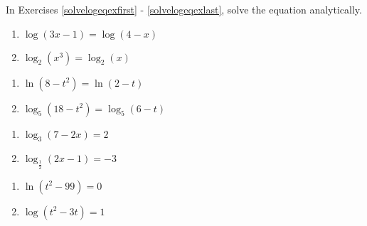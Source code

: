 \documentclass{ximera}
\begin{document}
	\author{Stitz-Zeager}



\label{ExercisesforLogarithmicEquationsandInequalities}

In Exercises \ref{solvelogeqexfirst} - \ref{solvelogeqexlast}, solve the equation analytically.

\begin{multicols}{2}
\begin{enumerate}

\item $\log(3x-1) = \log(4-x)$   \label{solvelogeqexfirst}

\item $\log_{2}\left(x^{3}\right) = \log_{2}(x)$

\setcounter{HW}{\value{enumi}}
\end{enumerate}
\end{multicols}

\begin{multicols}{2}
\begin{enumerate}
\setcounter{enumi}{\value{HW}}

\item $\ln\left(8-t^2\right)=\ln(2-t)$ 

\item $\log_{5}\left(18-t^2\right) = \log_{5}(6-t)$

\setcounter{HW}{\value{enumi}}
\end{enumerate}
\end{multicols}

\begin{multicols}{2}
\begin{enumerate}
\setcounter{enumi}{\value{HW}}

\item $\log_{3}(7-2x) = 2$ 
\item $\log_{\frac{1}{2}} (2x-1) = -3$

\setcounter{HW}{\value{enumi}}
\end{enumerate}
\end{multicols}

\begin{multicols}{2}
\begin{enumerate}
\setcounter{enumi}{\value{HW}}

\item $\ln\left(t^2-99\right) = 0$
\item $\log(t^2-3t) = 1$

\setcounter{HW}{\value{enumi}}
\end{enumerate}
\end{multicols}
\end{document}
